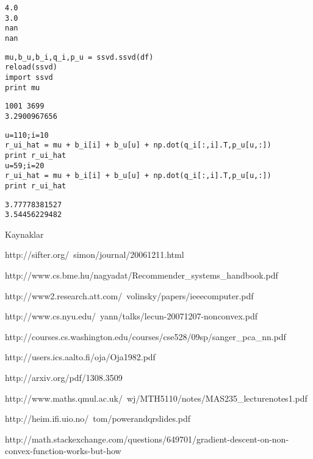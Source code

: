 \documentclass[12pt,fleqn]{article}\usepackage{../common}
\begin{document}
\begin{verbatim}
4.0
3.0
nan
nan
\end{verbatim}


\begin{verbatim}
mu,b_u,b_i,q_i,p_u = ssvd.ssvd(df)
reload(ssvd)
import ssvd 
print mu
\end{verbatim}

\begin{verbatim}
1001 3699
3.2900967656
\end{verbatim}


\begin{verbatim}
u=110;i=10
r_ui_hat = mu + b_i[i] + b_u[u] + np.dot(q_i[:,i].T,p_u[u,:])
print r_ui_hat
u=59;i=20
r_ui_hat = mu + b_i[i] + b_u[u] + np.dot(q_i[:,i].T,p_u[u,:])
print r_ui_hat
\end{verbatim}

\begin{verbatim}
3.77778381527
3.54456229482
\end{verbatim}

Kaynaklar

http://sifter.org/~simon/journal/20061211.html

http://www.cs.bme.hu/nagyadat/Recommender_systems_handbook.pdf

http://www2.research.att.com/~volinsky/papers/ieeecomputer.pdf

http://www.cs.nyu.edu/~yann/talks/lecun-20071207-nonconvex.pdf

http://courses.cs.washington.edu/courses/cse528/09sp/sanger_pca_nn.pdf

http://users.ics.aalto.fi/oja/Oja1982.pdf

http://arxiv.org/pdf/1308.3509

http://www.maths.qmul.ac.uk/~wj/MTH5110/notes/MAS235_lecturenotes1.pdf

http://heim.ifi.uio.no/~tom/powerandqrslides.pdf

http://math.stackexchange.com/questions/649701/gradient-descent-on-non-convex-function-works-but-how
\end{document}
